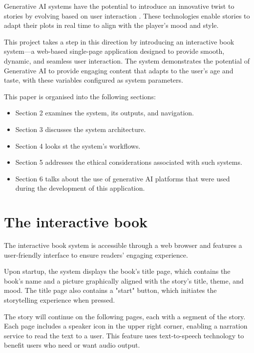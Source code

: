\documentclass[conference]{IEEEtran}
\begin{document}
	Generative AI systems have the potential to introduce an innovative twist to stories by evolving based on user interaction\cite{vidrih2023generative} \cite{fotedar2020storytelling}. These technologies enable stories to adapt their plots in real time to align with the player’s mood and style.
	
	This project takes a step in this direction by introducing an interactive book system—a web-based single-page application designed to provide smooth, dynamic, and seamless user interaction. The system demonstrates the potential of Generative AI to provide engaging content that adapts to the user's age and taste, with these variables configured as system parameters.
	
	This paper is organised into the following sections:
	
	\begin{itemize}
		
		\item Section 2 examines the system, its outputs, and navigation.
		\item Section 3 discusses the system architecture.
		\item Section 4 looks st the system's workflows.
		\item Section 5 addresses the ethical considerations associated with such systems.
		\item Section 6 talks about the use of generative AI platforms that were used during the development of this application.
		
	\end{itemize}
	
	
	\section{The interactive book}
	
	The interactive book system is accessible through a web browser and features a user-friendly interface to ensure readers' engaging experience.
	
	Upon startup, the system displays the book's title page, which contains the book's name and a picture graphically aligned with the story's title, theme, and mood. The title page also contains a "start" button, which initiates the storytelling experience when pressed.
	
	The story will continue on the following pages, each with a segment of the story. Each page includes a speaker icon in the upper right corner, enabling a narration service to read the text to a user. This feature uses text-to-speech technology to benefit users who need or want audio output.
	
\end{document}
